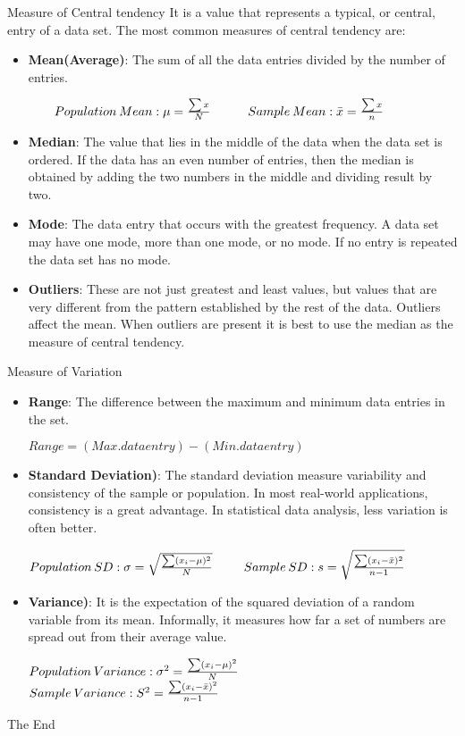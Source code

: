 \documentclass{beamer}
\begin{document}
\begin{frame}{Measure of Central tendency}
\justify
	It is a value that represents a typical, or central, entry of a data set. The most common measures of central tendency are:
	\begin{itemize}
		\item \textbf{Mean(Average)}: The sum of all the data entries divided by the number of entries.
		
			$\hspace{20 pt} Population \hspace{2 pt}Mean: \mu = \frac{\sum x}{N} \hspace{30pt} Sample \hspace{2 pt}Mean: \bar{x} = \frac{\sum x}{n}$
		\item \textbf{Median}: The value that lies in the middle of the data when the data set is ordered. If the data has an even number of entries, then the median is obtained by adding the two numbers in the middle and dividing result by two.
		\item \textbf{Mode}: The data entry that occurs with the greatest frequency. A data set may have one mode, more than one mode, or no mode. If no entry is repeated the data set has no mode.
		\item \textbf{Outliers}: These are not just greatest and least values, but values that are very different from the pattern established by the rest of the data. Outliers affect the mean. When outliers are present it is best to use the median as the measure of central tendency.
	\end{itemize}
\end{frame}
\begin{frame}{Measure of Variation}
	\begin{itemize}
		\item \textbf{Range}:  The difference between the maximum and minimum data entries in the set. 
		
		$Range = (Max. data entry) - (Min. data entry)$
		\item \textbf{Standard Deviation)}: The standard deviation measure variability and consistency of the sample or population. In most real-world applications, consistency is a great advantage. In statistical data analysis, less variation is often better.
		
			$Population \hspace{2 pt}SD: \sigma = \sqrt{\frac{\sum (x_i - \mu)^2}{N}} \hspace{25pt} Sample \hspace{2 pt}SD: s = \sqrt{\frac{\sum (x_i - \bar{x})^2}{n - 1}}$
		\item \textbf{Variance)}: It is the expectation of the squared deviation of a random variable from its mean. Informally, it measures how far a set of numbers are spread out from their average value.
		
			$Population \hspace{2 pt}Variance: \sigma^2 = \frac{\sum (x_i - \mu)^2}{N}$\\
			$Sample \hspace{2 pt}Variance: S^2 = \frac{\sum (x_i - \bar{x})^2}{n - 1}$
	\end{itemize}
\end{frame}
	
\begin{frame}
\huge{\centerline{The End}}
\end{frame}
\end{document}
